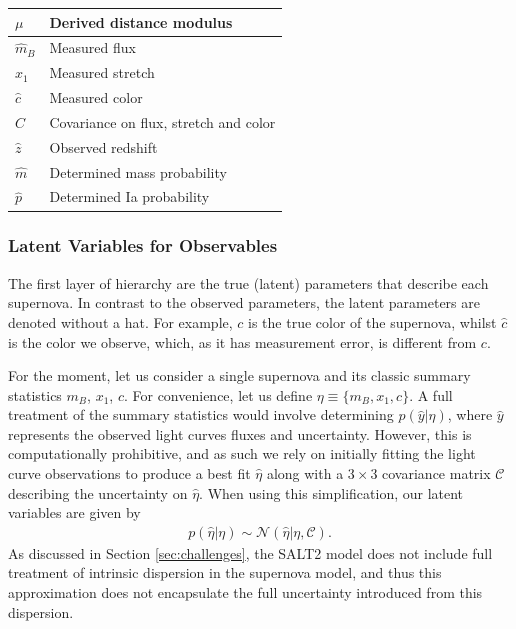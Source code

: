 \documentclass[a4paper,fleqn,usenatbib]{mnras}
\newcommand{\green}{\color{forestgreen}}
\begin{document}
\begin{table}
\begin{tabular}{ll}
		$\mu$ & Derived distance modulus \\
		\hline
		$\hat{m}_B$ & Measured flux\\
		$\hat{x}_1$ & Measured stretch \\
		$\hat{c}$ & Measured color \\
		$C$ & Covariance on flux, stretch and color \\
		$\hat{z}$ & Observed redshift \\
		$\hat{m}$ & Determined mass probability \\
		$\hat{p}$ & Determined Ia probability \\
		\hline
	\end{tabular}
\end{table}


\subsubsection{Latent Variables for Observables}

{\green The first layer of hierarchy are the true (latent) parameters that describe each supernova. In contrast to the observed parameters, the latent parameters are denoted without a hat.} For example, $c$ is the true color of the supernova, whilst $\hat{c}$ is the color we observe, which, as it has measurement error, is different from $c$.

For the moment, let us consider a single supernova and its classic summary statistics $m_B$, $x_1$, $c$. For convenience, let us define $\eta \equiv \lbrace m_B, x_1, c \rbrace$. A full treatment of the summary statistics would involve determining $p(\hat{y}|\eta)$, where $\hat{y}$ represents the observed light curves {\green fluxes} and uncertainty. However, this is computationally prohibitive, and as such we rely on initially fitting the light curve observations to produce a best fit $\hat{\eta}$ along with a $3\times3$ covariance matrix $\mathcal{C}$ describing the uncertainty on $\hat{\eta}$. When using this simplification, our latent variables are given by
\begin{align}
p(\hat{\eta}|\eta) \sim \mathcal{N}(\hat{\eta} | \eta, \mathcal{C}). \label{eq:pop}
\end{align}
As discussed in Section \ref{sec:challenges}, {\green the SALT2 model does not include full treatment of intrinsic dispersion in the supernova model, and thus this approximation does not encapsulate the full uncertainty introduced from this dispersion.}
\end{document}

